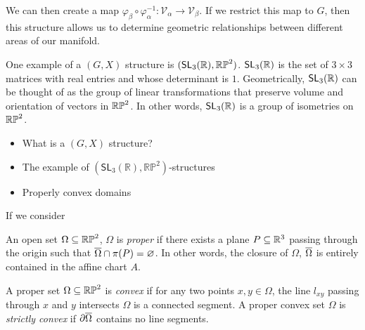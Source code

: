\documentclass{amsart}
\begin{document}
	We can then create a map $\varphi_\beta \circ \varphi_\alpha^{-1} \colon \mathcal{V}_\alpha \to \mathcal{V}_\beta$. If we restrict this map to $G$, then this structure allows us to determine geometric relationships between different areas of our manifold.
	
	One example of a $(G,X)$ structure is $(\mathsf{SL}_3(\mathbb{R}), \mathbb{RP}^2)$. $\mathsf{SL}_3(\mathbb{R})$ is the set of $3\times3$ matrices with real entries and whose determinant is $1$. Geometrically, $\mathsf{SL}_3(\mathbb{R})$ can be thought of as the group of linear transformations that preserve volume and orientation of vectors in $\mathbb{RP}^2$. In other words, $\mathsf{SL}_3(\mathbb{R})$ is a group of isometries on $\mathbb{RP}^2$.
	
	\begin{tcolorbox}
		\begin{itemize}
			\item What is a $(G,X)$ structure?
			\item The example of $(\mathsf{SL}_3(\mathbb R),\mathbb{RP}^2)$-structures
			\item Properly convex domains
		\end{itemize}
	\end{tcolorbox}
	
	
	If we consider 
	

	\begin{definition}
		An open set $\Omega \subseteq \mathbb{RP}^2$, $\Omega$ is \emph{proper} if there exists a plane $P \subseteq \mathbb{R}^3$ passing through the origin such that $\overline{\Omega} \cap \pi(P) = \varnothing$. In other words, the closure of $\Omega$, $\overline{\Omega}$ is entirely contained in the affine chart $A$.
	\end{definition}
	
	\begin{definition}
		A proper set $\Omega \subseteq \mathbb{RP}^2$ is \emph{convex} if for any two points $x,y \in \Omega$, the line $l_{xy}$ passing through $x$ and $y$ intersects $\Omega$ is a connected segment. A proper convex set $\Omega$ is \emph{strictly convex} if $\partial \overline{\Omega}$ contains no line segments.
	\end{definition}
	
	
\end{document}
